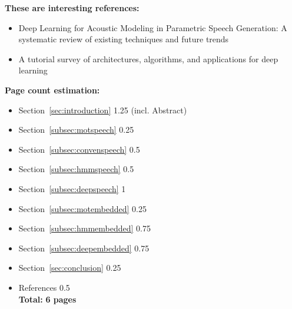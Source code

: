 \vspace{5em}

\textbf{\Large These are interesting references:}
\vspace{1em}
\begin{itemize}[leftmargin=10pt]
	\item Deep Learning for Acoustic Modeling in Parametric Speech Generation: A systematic review of existing techniques and future trends \cite{ling:deep}
	\item A tutorial survey of architectures, algorithms, and applications for deep learning \cite{li:survey}
\end{itemize}

\vspace{5em}

\textbf{\Large Page count estimation:}
\vspace{1em}
\begin{itemize}[leftmargin=10pt]	
	\item Section~\ref{sec:introduction}\hspace{4em} 			1.25 \hspace{2em} \textcolor{black!40}{(incl. Abstract)}
	\item Section~\ref{subsec:motspeech}\hspace{3.35em} 		0.25
	\item Section~\ref{subsec:convenspeech}\hspace{3.35em} 		0.5
	\item Section~\ref{subsec:hmmspeech}\hspace{3.35em} 		0.5
	\item Section~\ref{subsec:deepspeech}\hspace{3.35em} 		1
	\item Section~\ref{subsec:motembedded}\hspace{3.35em} 		0.25
	\item Section~\ref{subsec:hmmembedded}\hspace{3.35em} 		0.75
	\item Section~\ref{subsec:deepembedded}\hspace{3.35em} 		0.75
	\item Section~\ref{sec:conclusion}\hspace{4em}				0.25
	\item References\hspace{3.35em}								0.5\\[0.5em]
	\textbf{Total:}\hspace{5.2em} 								\textbf{6 pages}
\end{itemize}

\clearpage
